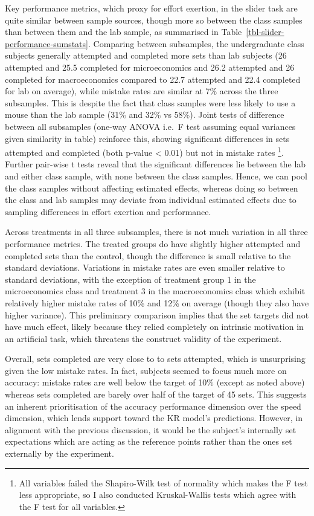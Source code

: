 \documentclass[
  12,
  letterpaper,
  DIV=11,
  numbers=noendperiod]{scrartcl}
\newcounter{none} %
\begin{document}
Key performance metrics, which proxy for effort exertion, in the slider
task are quite similar between sample sources, though more so between
the class samples than between them and the lab sample, as summarised in
Table~\ref{tbl-slider-performance-sumstats}. Comparing between
subsamples, the undergraduate class subjects generally attempted and
completed more sets than lab subjects (26 attempted and 25.5 completed
for microeconomics and 26.2 attempted and 26 completed for
macroeconomics compared to 22.7 attempted and 22.4 completed for lab on
average), while mistake rates are similar at 7\% across the three
subsamples. This is despite the fact that class samples were less likely
to use a mouse than the lab sample (31\% and 32\% vs 58\%). Joint tests
of difference between all subsamples (one-way ANOVA i.e.~F test assuming
equal variances given similarity in table) reinforce this, showing
significant differences in sets attempted and completed (both p-value
\textless{} 0.01) but not in mistake rates \footnote{All variables
  failed the Shapiro-Wilk test of normality which makes the F test less
  appropriate, so I also conducted Kruskal-Wallis tests which agree with
  the F test for all variables.}. Further pair-wise t tests reveal that
the significant differences lie between the lab and either class sample,
with none between the class samples. Hence, we can pool the class
samples without affecting estimated effects, whereas doing so between
the class and lab samples may deviate from individual estimated effects
due to sampling differences in effort exertion and performance.

Across treatments in all three subsamples, there is not much variation
in all three performance metrics. The treated groups do have slightly
higher attempted and completed sets than the control, though the
difference is small relative to the standard deviations. Variations in
mistake rates are even smaller relative to standard deviations, with the
exception of treatment group 1 in the microeconomics class and treatment
3 in the macroeconomics class which exhibit relatively higher mistake
rates of 10\% and 12\% on average (though they also have higher
variance). This preliminary comparison implies that the set targets did
not have much effect, likely because they relied completely on intrinsic
motivation in an artificial task, which threatens the construct validity
of the experiment.

Overall, sets completed are very close to to sets attempted, which is
unsurprising given the low mistake rates. In fact, subjects seemed to
focus much more on accuracy: mistake rates are well below the target of
10\% (except as noted above) whereas sets completed are barely over half
of the target of 45 sets. This suggests an inherent prioritisation of
the accuracy performance dimension over the speed dimension, which lends
support toward the KR model's predictions. However, in alignment with
the previous discussion, it would be the subject's internally set
expectations which are acting as the reference points rather than the
ones set externally by the experiment.
\end{document}
